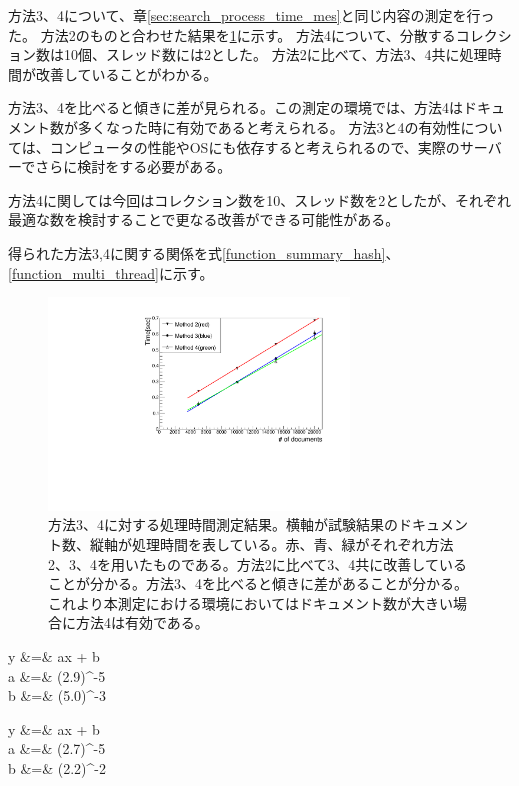 方法3、4について、章\ref{sec:search_process_time_mes}と同じ内容の測定を行った。
方法2のものと合わせた結果を\ref{searching_time_2}に示す。
方法4について、分散するコレクション数は10個、スレッド数には2とした。
方法2に比べて、方法3、4共に処理時間が改善していることがわかる。

方法3、4を比べると傾きに差が見られる。この測定の環境では、方法4はドキュメント数が多くなった時に有効であると考えられる。
方法3と4の有効性については、コンピュータの性能やOSにも依存すると考えられるので、実際のサーバーでさらに検討をする必要がある。

方法4に関しては今回はコレクション数を10、スレッド数を2としたが、それぞれ最適な数を検討することで更なる改善ができる可能性がある。

得られた方法3,4に関する関係を式\ref{function_summary_hash}、\ref{function_multi_thread}に示す。

\begin{figure}[bpt]
  \begin{center}
    \includegraphics[width=8cm,angle=270]{./searching_time_2.pdf}
  \caption[方法3、4に対する処理時間測定結果]{方法3、4に対する処理時間測定結果。横軸が試験結果のドキュメント数、縦軸が処理時間を表している。赤、青、緑がそれぞれ方法2、3、4を用いたものである。方法2に比べて3、4共に改善していることが分かる。方法3、4を比べると傾きに差があることが分かる。これより本測定における環境においてはドキュメント数が大きい場合に方法4は有効である。}
  \label{searching_time_2}
  \end{center}
\end{figure}

\bbb
\label{function_summary_hash}
y &=& ax + b \\
a &=& (2.9)^{-5} \nonumber \\
b &=& (5.0)^{-3} \nonumber
\eee

\bbb
\label{function_multi_thread}
y &=& ax + b \\
a &=& (2.7)^{-5} \nonumber \\
b &=& (2.2)^{-2} \nonumber
\eee

